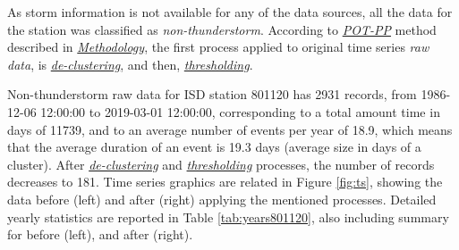 \documentclass[12pt,oneside]{reedthesis}
\begin{document}
As storm information is not available for any of the data sources, all the data for the station was classified as \emph{non-thunderstorm}. According to \emph{\protect\hyperlink{pot-pp}{POT-PP}} method described in \emph{\protect\hyperlink{rmd-method}{Methodology}}, the first process applied to original time series \emph{raw data}, is \emph{\protect\hyperlink{decluster}{de-clustering}}, and then, \emph{\protect\hyperlink{thresholding}{thresholding}}.

Non-thunderstorm raw data for ISD station 801120 has 2931 records, from 1986-12-06 12:00:00 to 2019-03-01 12:00:00, corresponding to a total amount time in days of 11739, and to an average number of events per year of 18.9, which means that the average duration of an event is 19.3 days (average size in days of a cluster). After \emph{\protect\hyperlink{decluster}{de-clustering}} and \emph{\protect\hyperlink{thresholding}{thresholding}} processes, the number of records decreases to 181. Time series graphics are related in Figure \ref{fig:ts}, showing the data before (left) and after (right) applying the mentioned processes. Detailed yearly statistics are reported in Table \ref{tab:years801120}, also including summary for before (left), and after (right).
\end{document}
